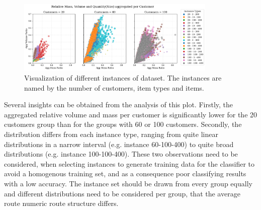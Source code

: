 \begin{figure}[ht]
    \centering
    \includegraphics[width=0.85\textwidth]{pictures/krebs_instances_detailed.png}
    \caption[Visualization of different instances of \textcite{krebs_advanced_2021} dataset.]{Visualization of different instances of \krebsADataSetText dataset.
        The instances are named by the number of customers, item types and items.}
    \label{fig:krebs_dataset_analysis_detailes}
\end{figure}

Several insights can be obtained from the analysis of this plot. Firstly, the aggregated relative
volume and mass per customer is significantly lower for the 20 customers group than for the groups with 60 or 100 customers.
Secondly, the distribution differs from each instance type, ranging from quite linear distributions in a narrow
interval (e.g. instance 60-100-400) to quite broad distributions (e.g. instance 100-100-400). These two observations need to be considered,
when selecting instances to generate training data for the classifier to avoid a homogenous training set, and
as a consequence poor classifying results with a low accuracy. The instance set should be drawn from every group equally and
different distributions need to be considered per group, that the average route numeric route structure differs.

\subsubsection{\gendreauDataSetText}

